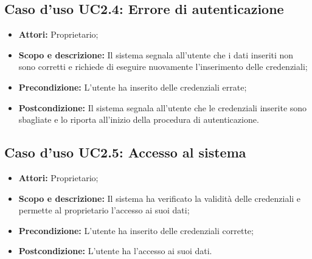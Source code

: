 \subsection{Caso d'uso UC2.4: Errore di autenticazione}
\begin{itemize}
	\item \textbf{Attori:} Proprietario;
	\item \textbf{Scopo e descrizione:} Il sistema segnala all'utente che i dati inseriti non sono corretti e richiede di eseguire nuovamente l'inserimento delle credenziali;
	\item \textbf{Precondizione:} L'utente ha inserito delle credenziali errate;
	\item \textbf{Postcondizione:} Il sistema segnala all'utente che le credenziali inserite sono sbagliate e lo riporta all'inizio della procedura di autenticazione.
\end{itemize}

\subsection{Caso d'uso UC2.5: Accesso al sistema}
\begin{itemize}
	\item \textbf{Attori:} Proprietario;
	\item \textbf{Scopo e descrizione:} Il sistema ha verificato la validità delle credenziali e permette al proprietario l'accesso ai suoi dati;
	\item \textbf{Precondizione:} L'utente ha inserito delle credenziali corrette;
	\item \textbf{Postcondizione:} L'utente ha l'accesso ai suoi dati.
\end{itemize}

\newpage
